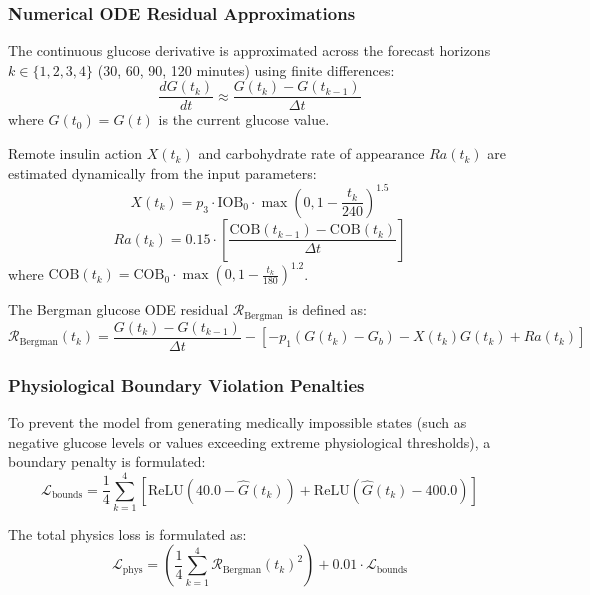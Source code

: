 \documentclass[10pt,journal,compsoc,twocolumn]{IEEEtran}
\begin{document}
\subsubsection{Numerical ODE Residual Approximations}
The continuous glucose derivative is approximated across the forecast horizons $k \in \{1, 2, 3, 4\}$ (30, 60, 90, 120 minutes) using finite differences:
\begin{equation}
\frac{dG(t_k)}{dt} \approx \frac{G(t_k) - G(t_{k-1})}{\Delta t}
\end{equation}
where $G(t_0) = G(t)$ is the current glucose value. 

Remote insulin action $X(t_k)$ and carbohydrate rate of appearance $Ra(t_k)$ are estimated dynamically from the input parameters:
\begin{equation}
X(t_k) = p_3 \cdot \text{IOB}_0 \cdot \max\left(0, 1 - \frac{t_k}{240}\right)^{1.5}
\end{equation}
\begin{equation}
Ra(t_k) = 0.15 \cdot \left[ \frac{\text{COB}(t_{k-1}) - \text{COB}(t_k)}{\Delta t} \right]
\end{equation}
where $\text{COB}(t_k) = \text{COB}_0 \cdot \max\left(0, 1 - \frac{t_k}{180}\right)^{1.2}$.

The Bergman glucose ODE residual $\mathcal{R}_{\text{Bergman}}$ is defined as:
\begin{equation}
\mathcal{R}_{\text{Bergman}}(t_k) = \frac{G(t_k) - G(t_{k-1})}{\Delta t} - \left[ -p_1\left(G(t_k) - G_b\right) - X(t_k)G(t_k) + Ra(t_k) \right]
\end{equation}

\subsubsection{Physiological Boundary Violation Penalties}
To prevent the model from generating medically impossible states (such as negative glucose levels or values exceeding extreme physiological thresholds), a boundary penalty is formulated:
\begin{equation}
\mathcal{L}_{\text{bounds}} = \frac{1}{4} \sum_{k=1}^4 \left[ \text{ReLU}\left(40.0 - \hat{G}(t_k)\right) + \text{ReLU}\left(\hat{G}(t_k) - 400.0\right) \right]
\end{equation}

The total physics loss is formulated as:
\begin{equation}
\mathcal{L}_{\text{phys}} = \left( \frac{1}{4} \sum_{k=1}^4 \mathcal{R}_{\text{Bergman}}(t_k)^2 \right) + 0.01 \cdot \mathcal{L}_{\text{bounds}}
\end{equation}
\end{document}

